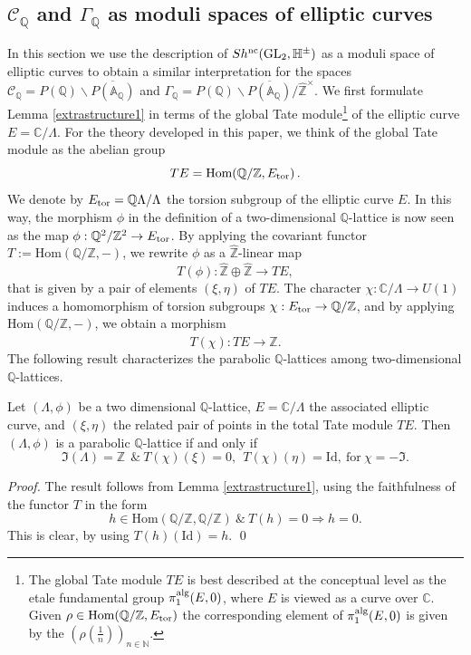 \documentclass[graybox, envcountsect%
]{svmult}
\def\GL{{\rm GL}}
\def\Hom{{\rm Hom}}
\def\id{{\rm id}}
\def\A{{\mathbb A}}
\def\C{{\mathbb C}}
\def\N{{\mathbb N}}
\def\Q{{\mathbb Q}}
\def\Z{{\mathbb Z}}
\def\H{{\mathbb H}}
\def\hatz{{\hat\Z^\times}}
\def\cC{{\mathcal C}}
\def\pie{{\pi_1^{\rm alg}}}
\def\gaq{{\Gamma_\Q}}
\def\caq{{\cC_\Q}}
\def\id{{\mbox{Id}}}
\def\Hom {{\mbox{Hom}}}
\begin{document}
\subsection{$\caq$ and $\gaq$ as moduli spaces of elliptic curves}\label{subsec:6.4}

In this section we use the description of $Sh^{\rm nc}(\GL_2,\H^\pm)$ as a moduli space of elliptic curves to obtain a similar interpretation  for the spaces $\caq=P(\Q)\backslash
\overline{P(\A_\Q)}$ and  $\gaq=P(\Q)\backslash
\overline{P(\A_\Q)}/\hatz$. We first formulate Lemma \ref{extrastructure1} in terms of the global Tate module\footnote{The global Tate module $TE$ is best described at the conceptual level as the etale fundamental group $\pie(E,0)$, where $E$ is viewed as a curve over $\C$. Given $\rho\in \Hom (\Q/\Z, E_{\rm tor })$ the corresponding element
of $\pie(E,0)$ is given by the $(\rho(\frac 1 n))_{n\in \N}$.} of the elliptic curve $E=\C/\Lambda$.   For the theory developed in this paper, we think of the global Tate module as the abelian group
\begin{equation}\label{torEhatZbis}
 TE= \Hom (\Q/\Z,
E_{\rm tor })\,.
\end{equation}
We denote by $E_{\rm tor }=\Q\Lambda/\Lambda$ 
the torsion subgroup
 of the elliptic curve $E$. In this way, the morphism 
$\phi$ in the definition of a two-dimensional $\Q$-lattice is now seen as the map $\phi:\Q^2/\Z^2 \to E_{\rm tor }$. By applying the covariant functor $T:=\Hom
(\Q/\Z, -)$, we rewrite  $\phi$ as a $\hat\Z$-linear map
\begin{equation}\label{phiH1}
T(\phi):\hat\Z\oplus\hat\Z \to TE,
\end{equation}
that is given by  a pair of elements $(\xi,\eta)$ of $TE$. The character $\chi:\C/\Lambda\to U(1)$ induces a homomorphism of torsion subgroups $\chi:E_{\rm tor }\to \Q/\Z$, and by applying $\Hom
(\Q/\Z, -)$, we obtain a morphism 
$$
T(\chi): TE\to \hat\Z.
$$
The following result characterizes the parabolic $\Q$-lattices among two-dimensional $\Q$-lattices.

\begin{proposition}\label{extrastructure2} Let $(\Lambda,\phi)$ be a two dimensional $\Q$-lattice, 
$E=\C/\Lambda$ the associated  elliptic curve, and
 $(\xi,\eta)$ the related pair of points in the total Tate module $TE$. Then $(\Lambda,\phi)$ is a parabolic $\Q$-lattice  if and only if 
\begin{equation}\label{charofP1}
\Im(\Lambda)=\Z \ \ \& \ T(\chi)(\xi)=0, \ \ T(\chi)(\eta)=\id, \ \text{for} \ \chi=-\Im.
\end{equation} 
\end{proposition}
\begin{proof} The result follows from Lemma \ref{extrastructure1}, using the faithfulness of the functor $T$ in the form $$
h\in \Hom
(\Q/\Z, \Q/\Z)\ \& \ T(h)=0 \Rightarrow h=0.
$$
This is clear, by using $T(h)(\id)=h$. \qed
\end{proof} 
\end{document}
